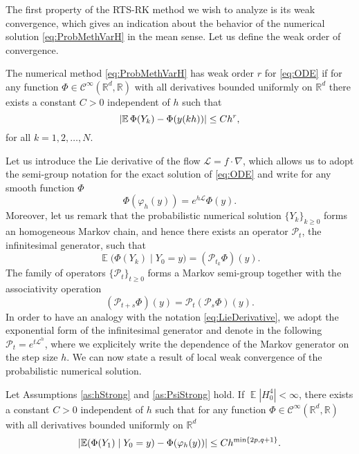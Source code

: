 \documentclass{siamart1116}
\numberwithin{theorem}{section}
\DeclarePairedDelimiter{\abs}{\lvert}{\rvert}
\renewcommand{\phi}{\varphi}
\newcommand{\R}{\mathbb{R}}
\newcommand{\diffL}{\mathcal{L}}
\newcommand{\E}{\operatorname{\mathbb{E}}}
\begin{document}
The first property of the RTS-RK method we wish to analyze is its weak convergence, which gives an indication about the behavior of the numerical solution \eqref{eq:ProbMethVarH} in the mean sense. Let us define the weak order of convergence. 
\begin{definition} The numerical method \eqref{eq:ProbMethVarH} has weak order $r$ for \eqref{eq:ODE} if for any function $\Phi\in \mathcal C^\infty(\R^d, \R)$ with all derivatives bounded uniformly on $\R^d$ there exists a constant $C > 0$ independent of $h$ such that
	\begin{equation}
		\abs{\E\Phi(Y_k) - \Phi(y(kh))} \leq Ch^r,
	\end{equation}
	for all $k = 1, 2, \ldots, N$.
\end{definition} 
Let us introduce the Lie derivative of the flow $\diffL = f \cdot \nabla$, which allows us to adopt the semi-group notation for the exact solution of \eqref{eq:ODE} and write for any smooth function $\Phi$
\begin{equation}\label{eq:LieDerivative}
	\Phi(\phi_h(y)) = e^{h\diffL} \Phi(y).
\end{equation}
Moreover, let us remark that the probabilistic numerical solution $\{Y_k\}_{k\geq 0}$ forms an homogeneous Markov chain, and hence there exists an operator $\mathcal{P}_t$, the infinitesimal generator, such that
\begin{equation}
	\E \big(\Phi(Y_{k})\mid Y_0 = y\big) = (\mathcal{P}_{t_k}\Phi)(y).
\end{equation}
The family of operators $\{\mathcal{P}_t\}_{t\geq 0}$ forms a Markov semi-group together with the associativity operation
\begin{equation}
	(\mathcal{P}_{t+s}\Phi)(y) = \mathcal{P}_t(\mathcal{P}_s \Phi)(y).
\end{equation}
In order to have an analogy with the notation \eqref{eq:LieDerivative}, we adopt the exponential form of the infinitesimal generator and denote in the following $\mathcal{P}_t = e^{t\diffL^h}$, where we explicitely write the dependence of the Markov generator on the step size $h$. We can now state a result of local weak convergence of the probabilistic numerical solution.
\begin{lemma}\label{thm:WeakLocalOrder} Let Assumptions \ref{as:hStrong} and \ref{as:PsiStrong} hold. If $\E|H_0^4| < \infty$, there exists a constant $C > 0$ independent of $h$ such that for any function $\Phi\in \mathcal{C}^{\infty}(\R^d,\R)$ with all derivatives bounded uniformly on $\R^d$
	\begin{equation}
		\abs{\E(\Phi(Y_1)\mid Y_0 = y) - \Phi(\phi_h(y))} \leq C h^{\min\{2p, q+1\}}.
	\end{equation}
\end{lemma}
\end{document}
